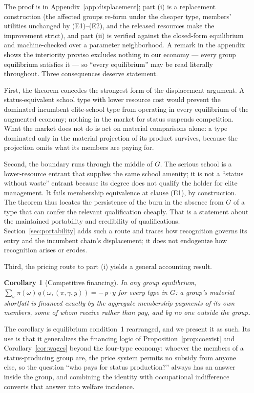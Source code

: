 \documentclass[12pt,letterpaper]{article}
\newtheorem{corollary}{Corollary}
\theoremstyle{definition}
\begin{document}
The proof is in Appendix~\ref{app:displacement}; part (i) is a replacement construction (the affected groups re-form under the cheaper type, members' utilities unchanged by (E1)--(E2), and the released resources make the improvement strict), and part (ii) is verified against the closed-form equilibrium and machine-checked over a parameter neighborhood.
A remark in the appendix shows the interiority proviso excludes nothing in our economy --- every group equilibrium satisfies it --- so ``every equilibrium'' may be read literally throughout.
Three consequences deserve statement.

First, the theorem concedes the strongest form of the displacement argument.
A status-equivalent school type with lower resource cost would prevent the dominated incumbent elite-school type from operating in every equilibrium of the augmented economy; nothing in the market for status suspends competition.
What the market does not do is act on material comparisons alone: a type dominated only in the material projection of its product survives, because the projection omits what its members are paying for.

Second, the boundary runs through the middle of $G$.
The serious school is a lower-resource entrant that supplies the same school amenity; it is not a ``status without waste'' entrant because its degree does not qualify the holder for elite management.
It fails membership equivalence at clause (E1), by construction.
The theorem thus locates the persistence of the burn in the absence from $G$ of a type that can confer the relevant qualification cheaply.
That is a statement about the maintained portability and credibility of qualifications.
Section~\ref{sec:portability} adds such a route and traces how recognition governs its
entry and the incumbent chain's displacement; it does not endogenize how recognition
arises or erodes.

Third, the pricing route to part (i) yields a general accounting result.

\begin{corollary}[Competitive financing]\label{cor:financing}
In any group equilibrium, $\sum_{\omega}\pi(\omega)\,q(\omega,(\pi,\gamma,y)) = -\,p\cdot y$ for every type in $G$: a group's material shortfall is financed exactly by the aggregate membership payments of its own members, some of whom receive rather than pay, and by no one outside the group.
\end{corollary}

The corollary is equilibrium condition~1 rearranged, and we present it as such.
Its use is that it generalizes the financing logic of Proposition~\ref{prop:coexist} and Corollary~\ref{cor:wages} beyond the four-type economy: whoever the members of a status-producing group are, the price system permits no subsidy from anyone else, so the question ``who pays for status production?'' always has an answer inside the group, and combining the identity with occupational indifference converts that answer into welfare incidence.
\end{document}
